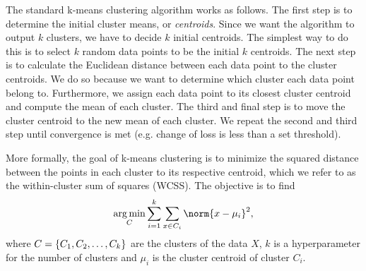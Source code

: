 The standard k-means clustering algorithm works as follows. The first step is to determine the initial cluster means, or \textit{centroids}. Since we want the algorithm to output $k$ clusters, we have to decide $k$ initial centroids. The simplest way to do this is to select $k$ random data points to be the initial $k$ centroids. The next step is to calculate the Euclidean distance between each data point to the cluster centroids. We do so because we want to determine which cluster each data point belong to. Furthermore, we assign each data point to its closest cluster centroid and compute the mean of each cluster. The third and final step is to move the cluster centroid to the new mean of each cluster. We repeat the second and third step until convergence is met (e.g. change of loss is less than a set threshold).

More formally, the goal of k-means clustering is to minimize the squared distance between the points in each cluster to its respective centroid, which we refer to as the within-cluster sum of squares (WCSS). The objective is to find
\begin{align}
    \argmin_{C} \sumlim{i=1}{k} \sumlim{x \in C_i}{} \norm{x - \mu_i}^2,
\end{align}
where $C = \left\{C_1, C_2, \ldots, C_k\right\}$ are the clusters of the data $X$, $k$ is a hyperparameter for the number of clusters and $\mu_i$ is the cluster centroid of cluster $C_i$.

